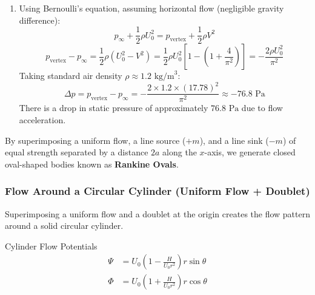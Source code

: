 \begin{exbox}
\begin{enumerate}
    \item Using Bernoulli's equation, assuming horizontal flow (negligible gravity difference):
    $$p_\infty + \frac{1}{2}\rho U_0^2 = p_{\text{vertex}} + \frac{1}{2}\rho V^2$$
    $$p_{\text{vertex}} - p_\infty = \frac{1}{2}\rho \left( U_0^2 - V^2 \right) = \frac{1}{2}\rho U_0^2 \left[ 1 - \left(1 + \frac{4}{\pi^2}\right) \right] = -\frac{2\rho U_0^2}{\pi^2}$$
    Taking standard air density $\rho \approx 1.2 \text{ kg/m}^3$:
    $$\Delta p = p_{\text{vertex}} - p_\infty = -\frac{2 \times 1.2 \times (17.78)^2}{\pi^2} \approx -76.8 \text{ Pa}$$
    There is a drop in static pressure of approximately $76.8 \text{ Pa}$ due to flow acceleration.
\end{enumerate}
\end{exbox}

\begin{notebox}
By superimposing a uniform flow, a line source ($+m$), and a line sink ($-m$) of equal strength separated by a distance $2a$ along the $x$-axis, we generate closed oval-shaped bodies known as \textbf{Rankine Ovals}.
\end{notebox}

\subsubsection{Flow Around a Circular Cylinder (Uniform Flow + Doublet)}

Superimposing a uniform flow and a doublet at the origin creates the flow pattern around a solid circular cylinder.

\begin{eqbox}{Cylinder Flow Potentials}
\begin{align*}
\Psi &= U_0 \left( 1 - \frac{H}{U_0 r^2} \right) r \sin\theta \\
\Phi &= U_0 \left( 1 + \frac{H}{U_0 r^2} \right) r \cos\theta
\end{align*}
\end{eqbox}

